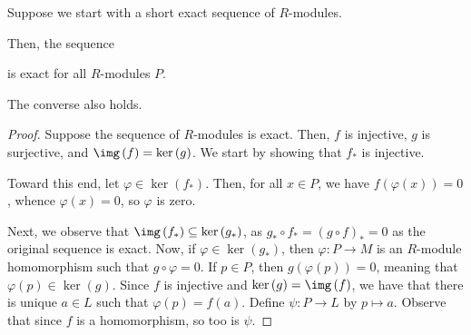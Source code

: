 \documentclass[10pt]{mypackage}
\begin{document}
\begin{proposition}
  Suppose we start with a short exact sequence of $R$-modules.
  \begin{center}
  \end{center}
  Then, the sequence
  \begin{center}
  \end{center}
  is exact for all $R$-modules $P$.
\end{proposition}
\begin{remark}
  The converse also holds.
\end{remark}
\begin{proof}
  Suppose the sequence of $R$-modules is exact. Then, $f$ is injective, $g$ is surjective, and $\img\left( f \right) = \ker\left( g \right)$. We start by showing that $f_{\ast}$ is injective.%

  Toward this end, let $\varphi\in \ker\left( f_{\ast} \right)$. Then, for all $x\in P$, we have $f\left( \varphi\left( x \right) \right) = 0$, whence $\varphi\left( x \right) = 0$, so $\varphi$ is zero.%

  Next, we observe that $\img\left( f_{\ast} \right)\subseteq \ker\left( g_{\ast} \right)$, as $g_{\ast}\circ f_{\ast} = \left( g\circ f \right)_{\ast} = 0$ as the original sequence is exact. Now, if $\varphi\in \ker\left( g_{\ast} \right)$, then $\varphi\colon P\rightarrow M$ is an $R$-module homomorphism such that $g\circ\varphi = 0$. If $p\in P$, then $g\left( \varphi\left( p \right) \right) = 0$, meaning that $\varphi\left( p \right) \in \ker\left( g \right)$. Since $f$ is injective and $\ker\left( g \right) = \img\left( f \right)$, we have that there is unique $a\in L$ such that $\varphi\left( p \right) = f(a)$. Define $\psi\colon P\rightarrow L$ by $p\mapsto a$. Observe that since $f$ is a homomorphism, so too is $\psi$.
\end{proof}
\end{document}
